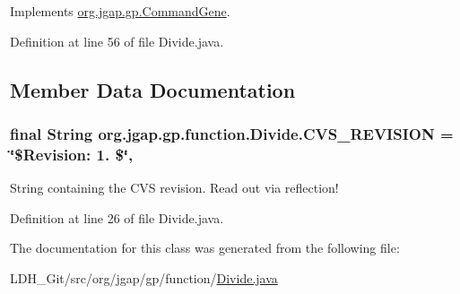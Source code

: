 Implements \hyperlink{classorg_1_1jgap_1_1gp_1_1_command_gene_a236141d99059da808afe7a9217e411c7}{org.\-jgap.\-gp.\-Command\-Gene}.



Definition at line 56 of file Divide.\-java.



\subsection{Member Data Documentation}
\hypertarget{classorg_1_1jgap_1_1gp_1_1function_1_1_divide_ac7c0e068af15482e4d193157816625de}{
\subsubsection[{C\-V\-S\-\_\-\-R\-E\-V\-I\-S\-I\-O\-N}]{\setlength{\rightskip}{0pt plus 5cm}final String org.\-jgap.\-gp.\-function.\-Divide.\-C\-V\-S\-\_\-\-R\-E\-V\-I\-S\-I\-O\-N = \char`\"{}\$Revision\-: 1. \$\char`\"{}\hspace{0.3cm}{\ttfamily [static]}, {\ttfamily [private]}}}\label{classorg_1_1jgap_1_1gp_1_1function_1_1_divide_ac7c0e068af15482e4d193157816625de}
String containing the C\-V\-S revision. Read out via reflection! 

Definition at line 26 of file Divide.\-java.



The documentation for this class was generated from the following file\-:\begin{DoxyCompactItemize}
\item 
L\-D\-H\-\_\-\-Git/src/org/jgap/gp/function/\hyperlink{_divide_8java}{Divide.\-java}\end{DoxyCompactItemize}
